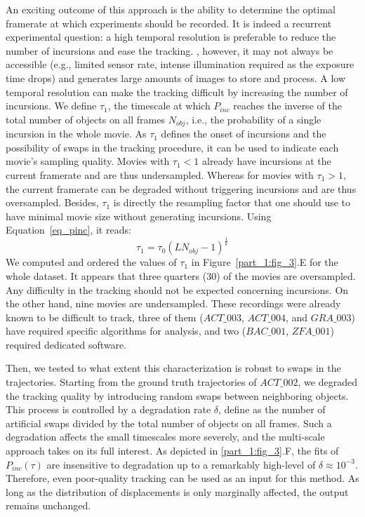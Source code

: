     An exciting outcome of this approach is the ability to determine the optimal framerate at which experiments should be recorded. It is indeed a recurrent experimental question: a high temporal resolution is preferable to reduce the number of incursions and ease the tracking. , however, it may not always be accessible (e.g., limited sensor rate, intense illumination required as the exposure time drops) and generates large amounts of images to store and process. A low temporal resolution can make the tracking difficult by increasing the number of incursions.
    We define $\tau_1$, the timescale at which $P_{inc}$ reaches the inverse of the total number of objects on all frames $N_{obj}$, i.e., the probability of a single incursion in the whole movie. As $\tau_1$ defines the onset of incursions and the possibility of swaps in the tracking procedure, it can be used to indicate each movie's sampling quality. Movies with $\tau_1<1$ already have incursions at the current framerate and are thus undersampled. Whereas for movies with $\tau_1>1$, the current framerate can be degraded without triggering incursions and are thus oversampled. Besides, $\tau_1$ is directly the resampling factor that one should use to have minimal movie size without generating incursions. Using Equation~\ref{eq_pinc}, it reads:
    \begin{equation}
        \label{eq:Pinc_tau0}
        \tau_1=\tau_0(LN_{obj}-1)^{\frac{1}{k}}
    \end{equation}
    We computed and ordered the values of $\tau_1$ in Figure~\ref{part_1:fig_3}.E for the whole dataset. It appears that three quarters (30) of the movies are oversampled. Any difficulty in the tracking should not be expected concerning incursions. On the other hand, nine movies are undersampled. These recordings were already known to be difficult to track, three of them ($ACT\_003$, $ACT\_004$, and $GRA\_003$) have required specific algorithms for analysis, and two ($BAC\_001$, $ZFA\_001$) required dedicated software.

    Then, we tested to what extent this characterization is robust to swaps in the trajectories. Starting from the ground truth trajectories of $ACT\_002$, we degraded the tracking quality by introducing random swaps between neighboring objects. This process is controlled by a degradation rate $\delta$, define as the number of artificial swaps divided by the total number of objects on all frames. Such a degradation affects the small timescales more severely, and the multi-scale approach takes on its full interest. As depicted in \ref{part_1:fig_3}.F, the fits of $P_{inc}(\tau)$ are insensitive to degradation up to a remarkably high-level of $\delta \approx 10^{-3}$. Therefore, even poor-quality tracking can be used as an input for this method. As long as the distribution of displacements is only marginally affected, the output remains unchanged.

